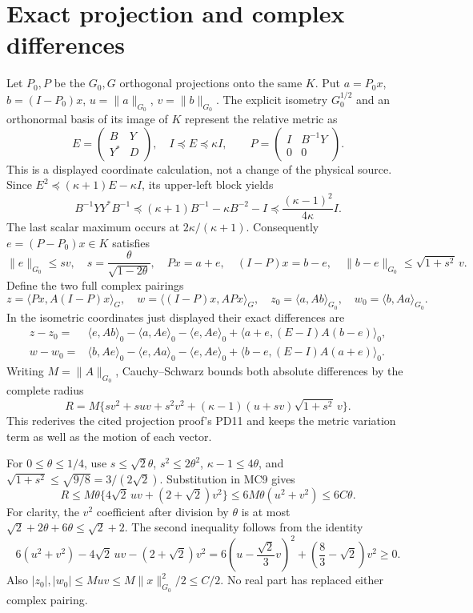 \section{Exact projection and complex differences}
Let $P_0,P$ be the $G_0,G$ orthogonal projections onto the same $K$.
Put $a=P_0x$, $b=(I-P_0)x$, $u=\|a\|_{G_0}$, $v=\|b\|_{G_0}$.
The explicit isometry $G_0^{1/2}$ and an orthonormal basis of its
image of $K$ represent the relative metric as
\[
 E=\begin{pmatrix}B&Y\\Y^*&D\end{pmatrix},\quad
 I\preceq E\preceq\kappa I,
 \qquad P=\begin{pmatrix}I&B^{-1}Y\\0&0\end{pmatrix}.
\]
This is a displayed coordinate calculation, not a change of the
physical source. Since
$E^2\preceq(\kappa+1)E-\kappa I$, its upper-left block yields
\[
 B^{-1}YY^*B^{-1}\preceq
 (\kappa+1)B^{-1}-\kappa B^{-2}-I
 \preceq\frac{(\kappa-1)^2}{4\kappa}I.
\]
The last scalar maximum occurs at $2\kappa/(\kappa+1)$.
Consequently $e=(P-P_0)x\in K$ satisfies
\[
 \|e\|_{G_0}\le s v,\quad s=\frac{\theta}{\sqrt{1-2\theta}},
 \quad Px=a+e,\quad (I-P)x=b-e,\quad
 \|b-e\|_{G_0}\le\sqrt{1+s^2}\,v.                            \tag{MC7}
\]
Define the two full complex pairings
\[
 z=\langle Px,A(I-P)x\rangle_G,\quad
 w=\langle(I-P)x,APx\rangle_G,
 \quad z_0=\langle a,Ab\rangle_{G_0},\quad
 w_0=\langle b,Aa\rangle_{G_0}.                               \tag{MC8}
\]
In the isometric coordinates just displayed their exact differences are
\begin{align*}
z-z_0={}&\langle e,Ab\rangle_0-\langle a,Ae\rangle_0
 -\langle e,Ae\rangle_0+\langle a+e,(E-I)A(b-e)\rangle_0,\\
w-w_0={}&\langle b,Ae\rangle_0-\langle e,Aa\rangle_0
 -\langle e,Ae\rangle_0+\langle b-e,(E-I)A(a+e)\rangle_0.
\end{align*}
Writing $M=\|A\|_{G_0}$, Cauchy--Schwarz bounds both absolute
differences by the complete radius
\[
 R=M\{sv^2+suv+s^2v^2+
 (\kappa-1)(u+sv)\sqrt{1+s^2}\,v\}.                          \tag{MC9}
\]
This rederives the cited projection proof's PD11 and keeps the metric
variation term as well as the motion of each vector.

For $0\le\theta\le1/4$, use
$s\le\sqrt2\theta$, $s^2\le2\theta^2$,
$\kappa-1\le4\theta$, and
$\sqrt{1+s^2}\le\sqrt{9/8}=3/(2\sqrt2)$.
Substitution in MC9 gives
\[
 R\le M\theta\{4\sqrt2\,uv+(2+\sqrt2)v^2\}
 \le6M\theta(u^2+v^2)\le6C\theta.                           \tag{MC10}
\]
For clarity, the $v^2$ coefficient after division by $\theta$ is
at most $\sqrt2+2\theta+6\theta\le\sqrt2+2$.
The second inequality follows from the identity
\[
 6(u^2+v^2)-4\sqrt2\,uv-(2+\sqrt2)v^2
 =6\left(u-\frac{\sqrt2}{3}v\right)^2
   +\left(\frac83-\sqrt2\right)v^2\ge0.
\]
Also $|z_0|,|w_0|\le Muv\le M\|x\|_{G_0}^2/2\le C/2$.
No real part has replaced either complex pairing.


